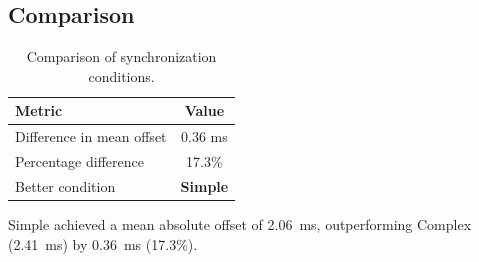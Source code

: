 \subsection*{Comparison}

\begin{table}[h!]
\centering
\begin{tabular}{|l|c|}
\hline
Metric & Value \\
\hline
Difference in mean offset & 0.36 ms \\
Percentage difference & 17.3\% \\
Better condition & \textbf{Simple} \\
\hline
\end{tabular}
\caption{Comparison of synchronization conditions.}
\label{tab:sync_comparison}
\end{table}

Simple achieved a mean absolute offset of 2.06~ms, outperforming Complex (2.41~ms) by 0.36~ms (17.3\%).
